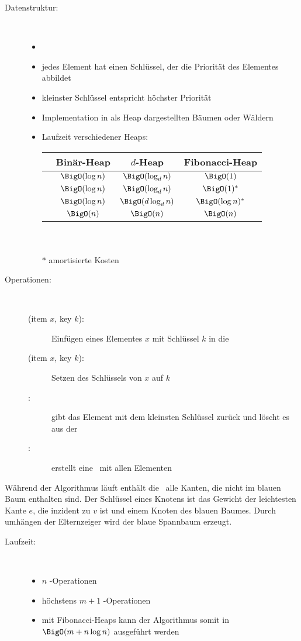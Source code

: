 \begin{description}
	\item[Datenstruktur:]\ \\\up
		\begin{itemize}
			\item \PQ
			\item jedes Element hat einen Schlüssel, der die Priorität des Elementes abbildet
			\item kleinster Schlüssel entspricht höchster Priorität
			\item Implementation in als Heap dargestellten Bäumen oder Wäldern
			\item Laufzeit verschiedener Heaps:\\
				\begin{tabular}{c||c|c|c}
				& Binär-Heap & $d$-Heap & Fibonacci-Heap\\\hline
				\insert & $\BigO(\log n)$ & $\BigO(\log_d n)$ & $\BigO(1)$\\\hline
				\decKey & $\BigO(\log n)$&$\BigO(\log_d n)$&$\BigO(1)^{*}$\\\hline
				\exMin&$\BigO(\log n)$&$\BigO(d \log_d n)$&$\BigO(\log n)^{*}$\\\hline
				\make &$\BigO(n)$&$\BigO(n)$&$\BigO(n)$
				\end{tabular}\\\\
			$*$ amortisierte Kosten
		\end{itemize}
	\item[Operationen:]\ \\\up
		\begin{description}
			\item[\insert(item $x$, key $k$):] Einfügen eines Elementes $x$ mit Schlüssel $k$ in die \PQ
			\item[\decKey(item $x$, key $k$):] Setzen des Schlüssels von $x$ auf $k$
			\item[\exMin:] gibt das Element mit dem kleinsten Schlüssel zurück und löscht es aus der \PQ
			\item[\make:] erstellt eine \PQ~mit allen Elementen
		\end{description}
\end{description}
Während der Algorithmus läuft enthält die \PQ~alle Kanten, die nicht im blauen Baum enthalten sind. Der Schlüssel eines Knotens ist das Gewicht der leichtesten Kante $e$, die inzident zu $v$ ist und einem Knoten des blauen Baumes. Durch umhängen der Elternzeiger wird der blaue Spannbaum erzeugt.
\begin{description}
	\item[Laufzeit:] \ \\\up
		\begin{itemize}
			\item $n$ \exMin-Operationen
			\item höchstens $m+1$ \decKey-Operationen
			\item mit Fibonacci-Heaps kann der Algorithmus somit in $\BigO(m+n\log n)$ ausgeführt werden
		\end{itemize}
\end{description}